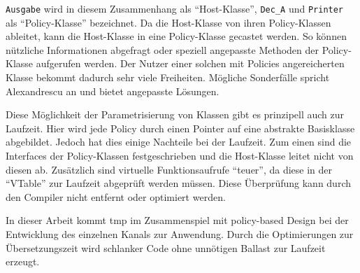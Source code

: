 \texttt{Ausgabe} wird in diesem Zusammenhang als \enquote{Host-Klasse}, \texttt{Dec\_A} und \texttt{Printer} als \enquote{Policy-Klasse} bezeichnet. Da die Host-Klasse von ihren Policy-Klassen ableitet, kann die Host-Klasse in eine Policy-Klasse gecastet werden. So können nützliche Informationen abgefragt oder speziell angepasste Methoden der Policy-Klasse aufgerufen werden. Der Nutzer einer solchen mit Policies angereicherten Klasse bekommt dadurch sehr viele Freiheiten. Mögliche Sonderfälle spricht Alexandrescu an und bietet angepasste Lösungen.



Diese Möglichkeit der Parametrisierung von Klassen gibt es prinzipell auch zur Laufzeit. Hier wird jede Policy durch einen Pointer auf eine abstrakte Basisklasse abgebildet. Jedoch hat dies einige Nachteile bei der Laufzeit. Zum einen sind die Interfaces der Policy-Klassen festgeschrieben und die Host-Klasse leitet nicht von diesen ab. Zusätzlich sind virtuelle Funktionsaufrufe \enquote{teuer}, da diese in der \enquote{VTable} zur Laufzeit abgeprüft werden müssen. Diese Überprüfung kann durch den Compiler nicht entfernt oder optimiert werden. 


In dieser Arbeit kommt \ac{tmp} im Zusammenspiel mit policy-based Design bei der Entwicklung des einzelnen Kanals zur Anwendung. Durch die Optimierungen zur Übersetzungszeit wird schlanker Code ohne unnötigen Ballast zur Laufzeit erzeugt.
